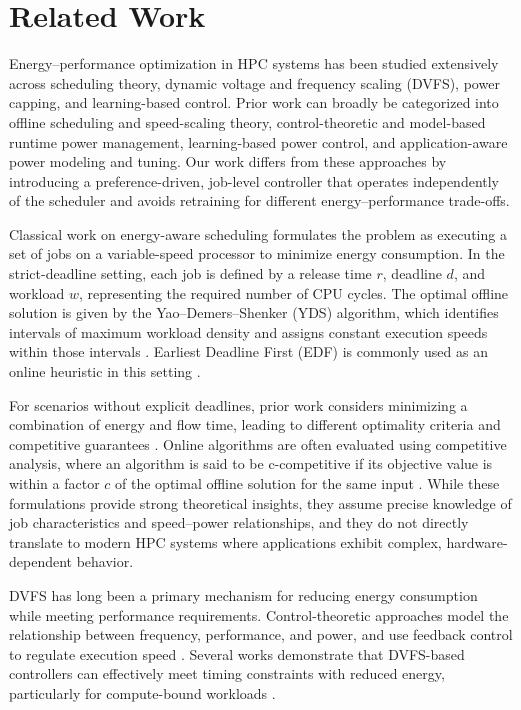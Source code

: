\section{Related Work} \label{ch5:sec:Related}
Energy–performance optimization in HPC systems has been studied extensively across scheduling theory, dynamic voltage and frequency scaling (DVFS), power capping, and learning-based control. Prior work can broadly be categorized into offline scheduling and speed-scaling theory, control-theoretic and model-based runtime power management, learning-based power control, and application-aware power modeling and tuning. Our work differs from these approaches by introducing a preference-driven, job-level controller that operates independently of the scheduler and avoids retraining for different energy–performance trade-offs.

Classical work on energy-aware scheduling formulates the problem as executing a set of jobs on a variable-speed processor to minimize energy consumption. In the strict-deadline setting, each job is defined by a release time $r$, deadline $d$, and workload $w$, representing the required number of CPU cycles. The optimal offline solution is given by the Yao–Demers–Shenker (YDS) algorithm, which identifies intervals of maximum workload density and assigns constant execution speeds within those intervals \cite{YDS}. Earliest Deadline First (EDF) is commonly used as an online heuristic in this setting \cite{YDS}.

For scenarios without explicit deadlines, prior work considers minimizing a combination of energy and flow time, leading to different optimality criteria and competitive guarantees \cite{ALBERS20151194}. Online algorithms are often evaluated using competitive analysis, where an algorithm is said to be c-competitive if its objective value is within a factor 
$c$ of the optimal offline solution for the same input \cite{YDS,ALBERS20151194}. While these formulations provide strong theoretical insights, they assume precise knowledge of job characteristics and speed–power relationships, and they do not directly translate to modern HPC systems where applications exhibit complex, hardware-dependent behavior.

DVFS has long been a primary mechanism for reducing energy consumption while meeting performance requirements. Control-theoretic approaches model the relationship between frequency, performance, and power, and use feedback control to regulate execution speed \cite{DVFS_Control, DVFS_optimization}. Several works demonstrate that DVFS-based controllers can effectively meet timing constraints with reduced energy, particularly for compute-bound workloads \cite{DVFS_Control}.

